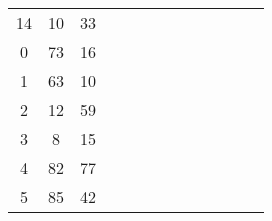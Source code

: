 \begin{table}[tb]
\begin{tabular}{ccccccccccccc}
		\multicolumn{1}{|c|}{14} & \multicolumn{1}{c|}{10} & \multicolumn{1}{c|}{33} &                         &                         &                         &                         &                         &                         &                         &                         &                         &                         \\ \cline{1-3}
		\multicolumn{1}{|c|}{0}  & \multicolumn{1}{c|}{73} & \multicolumn{1}{c|}{16} &                         &                         &                         &                         &                         &                         &                         &                         &                         &                         \\ \cline{1-3}
		\multicolumn{1}{|c|}{1}  & \multicolumn{1}{c|}{63} & \multicolumn{1}{c|}{10} &                         &                         &                         &                         &                         &                         &                         &                         &                         &                         \\ \cline{1-3}
		\multicolumn{1}{|c|}{2}  & \multicolumn{1}{c|}{12} & \multicolumn{1}{c|}{59} &                         &                         &                         &                         &                         &                         &                         &                         &                         &                         \\ \cline{1-3}
		\multicolumn{1}{|c|}{3}  & \multicolumn{1}{c|}{8}  & \multicolumn{1}{c|}{15} &                         &                         &                         &                         &                         &                         &                         &                         &                         &                         \\ \cline{1-3}
		\multicolumn{1}{|c|}{4}  & \multicolumn{1}{c|}{82} & \multicolumn{1}{c|}{77} &                         &                         &                         &                         &                         &                         &                         &                         &                         &                         \\ \cline{1-3}
		\multicolumn{1}{|c|}{5}  & \multicolumn{1}{c|}{85} & \multicolumn{1}{c|}{42} &                         &                         &                         &                         &                         &                         &                         &                         &                         &                         \\ \cline{1-3}

\end{tabular}
\end{table}
